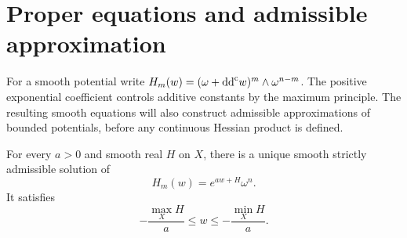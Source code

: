 \section{Proper equations and admissible approximation}
\label{sec:hessian-proper-approximation}

For a smooth potential write
$H_m(w)=(\omega+\mathrm{dd}^{\mathrm{c}} w)^m\wedge\omega^{n-m}$.
The positive exponential coefficient controls additive constants by the
maximum principle. The resulting smooth equations will also construct
admissible approximations of bounded potentials, before any continuous
Hessian product is defined.

\begin{lemma}\label{hessian:smooth-proper-existence}
For every $a>0$ and smooth real $H$ on $X$, there is a unique smooth
strictly admissible solution of
\[
 H_m(w)=e^{aw+H}\omega^n.
\]
It satisfies
\[
 -\frac{\max_X H}{a}\leq w\leq-\frac{\min_X H}{a}.
\]
\end{lemma}
